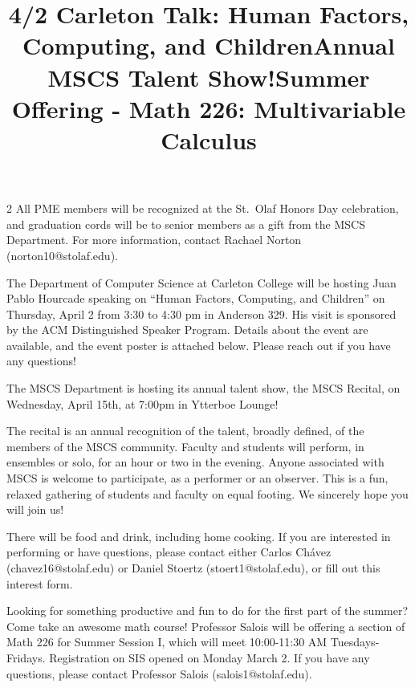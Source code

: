 \documentclass[12pt]{article}
\newcommand{\bolder}{\textbf}
\begin{document}
\begin{multicols}{2}
All PME members will be recognized at the St.~Olaf Honors Day celebration, and graduation cords will be to senior members as a gift from the MSCS Department. For more information, contact Rachael Norton (norton10@stolaf.edu).

 \begin{tcolorbox}[colback=white, colframe=black]
    \begin{center}
    \title{{\large \bolder{4/2 Carleton Talk: Human Factors, Computing, and Children}}}
    \end{center}
\end{tcolorbox}
The Department of Computer Science at Carleton College will be hosting Juan Pablo Hourcade speaking on “Human Factors, Computing, and Children” on Thursday, April 2 from 3:30 to 4:30 pm in Anderson 329. His visit is sponsored by the ACM Distinguished Speaker Program. Details about the event are available, and the event poster is attached below. Please reach out if you have any questions!

 \begin{tcolorbox}[colback=white, colframe=black]
    \begin{center}
    \title{{\large \bolder{Annual MSCS Talent Show!}}}
    \end{center}
\end{tcolorbox}
The MSCS Department is hosting its annual talent show, the MSCS Recital, on Wednesday, April 15th, at 7:00pm in Ytterboe Lounge!

The recital is an annual recognition of the talent, broadly defined, of the members of the MSCS community. Faculty and students will perform, in ensembles or solo, for an hour or two in the evening. Anyone associated with MSCS is welcome to participate, as a performer or an observer. This is a fun, relaxed gathering of students and faculty on equal footing. We sincerely hope you will join us!

There will be food and drink, including home cooking. If you are interested in performing or have questions, please contact either Carlos Chávez (chavez16@stolaf.edu) or Daniel Stoertz (stoert1@stolaf.edu), or fill out this interest form.


\begin{tcolorbox}[colback=white, colframe=black]
    \begin{center}
    \title{{\large \bolder{Summer Offering - Math 226: Multivariable Calculus}}}
    \end{center}
\end{tcolorbox}
Looking for something productive and fun to do for the first part of the summer?  Come take an awesome math course!  Professor Salois will be offering a section of Math 226 for Summer Session I, which will meet 10:00-11:30 AM Tuesdays-Fridays.  Registration on SIS opened on Monday March 2.  If you have any questions, please contact Professor Salois (salois1@stolaf.edu).  


\end{multicols}
\end{document}
